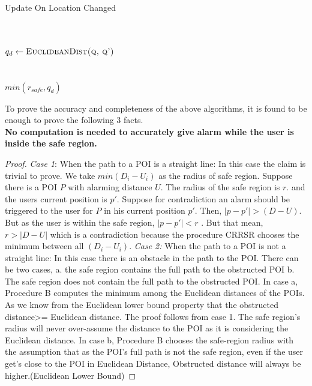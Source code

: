 \documentclass{sig-alternate}
\begin{document}
\begin{algorithm}
\caption{Update On Location Changed}
\label{ULC}
\begin{algorithmic}[5]

    \\
    \\$q_d \gets \textsc{EuclideanDist(q, q')}$
    \\
    \\
    \\
    \Return $min( r_{safe}, q_d )$

\EndProcedure
\end{algorithmic}
\end{algorithm}
To prove the accuracy and completeness of the above algorithms, it is found to be enough to prove the following 3 facts.\\

\textbf{No computation is needed to accurately give alarm while the user is inside the safe region.}\\

\begin{proof}
\textit{Case 1}: When the path to a POI is a straight line: 
In this case the claim is trivial to prove. We take $min( D_i - U_i )$ as the radius of safe region. Suppose there is a POI $P$ with alarming distance $U$. The radius of the safe region is $r$. and the users current position is $p'$. Suppose for contradiction an alarm should be triggered to the user for $P$ in his current position $p'$. Then, $|p-p'|>(D-U)$. But as the user is within the safe region, $|p-p'|<r$ . But that mean, $r>|D-U|$ which is a contradiction because the procedure CRRSR chooses the minimum between all $(D_i - U_i )$.
\textit{Case 2:} When the path to a POI is not a straight line: 
In this case there is an obstacle in the path to the POI. There can be two cases, 
a. the safe region contains the full path to the obstructed POI 
b. The safe region does not contain the full path to the obstructed POI.
In case a, Procedure B computes the minimum among the Euclidean distances of the POIs. As we know from the Euclidean lower bound property that the obstructed distance>= Euclidean distance. The proof follows from case 1. The safe region's radius will never over-assume the distance to the POI as it is considering the Euclidean distance.
In case b, Procedure B chooses the safe-region radius with the assumption that as the POI's full path is not the safe region, even if the user get's close to the POI in Euclidean Distance, Obstructed distance will always be higher.(Euclidean Lower Bound)
\end{proof}
\end{document}
